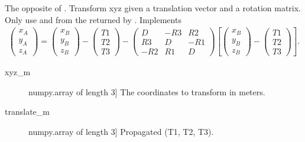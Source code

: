 \documentclass[a4paper,10pt,english]{sphinxmanual}
\begin{document}
\begin{fulllineitems}
\label{\detokenize{api-docs:etrsitrs.datumtransformation.reverse_transform}}
The opposite of . Transform xyz given a
translation vector and a rotation matrix. Only use 
and  from the  returned by
. Implements
\begin{equation*}
\begin{split}\left(\begin{array}{c} x_A \\ y_A \\ z_A\end{array}\right) = 
\left(\begin{array}{c} x_B \\ y_B \\ z_B\end{array}\right) -
\left(\begin{array}{c} T1 \\ T2 \\ T3\end{array}\right) -
\left(\begin{array}{ccc}
    D  & -R3 &  R2 \\
    R3 &  D  & -R1 \\ 
    -R2 &  R1 &  D
\end{array}\right)
\left[\left(\begin{array}{c} x_B \\ y_B \\ z_B\end{array}\right) - 
      \left(\begin{array}{c} T1 \\ T2 \\ T3\end{array}\right)\right].\end{split}
\end{equation*}
\begin{description}
\item[{xyz\_m}] \leavevmode{[}numpy.array of length 3{]}
The coordinates to transform in meters.

\item[{translate\_m}] \leavevmode{[}numpy.array of length 3{]}
Propagated (T1, T2, T3).


\end{description}
\end{fulllineitems}
\end{document}
